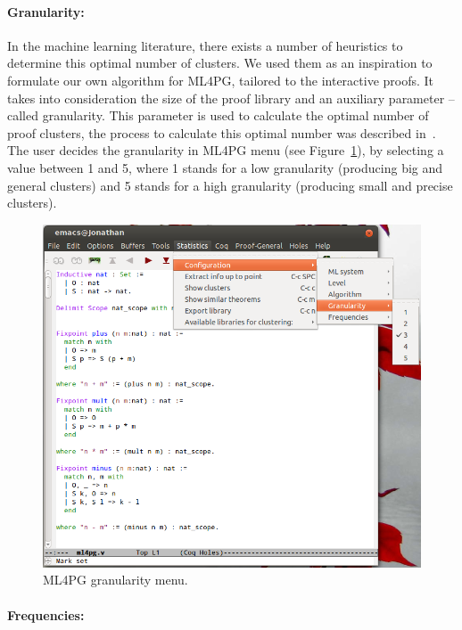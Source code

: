 \documentclass[10pt]{article}
\begin{document}
\paragraph{Granularity:}

In the machine learning literature, there exists a number of heuristics to determine this optimal number of clusters.
We used them as an inspiration to formulate our own algorithm for ML4PG, tailored
to the interactive proofs. It takes into consideration the size of the proof library and an auxiliary parameter 
 -- called granularity. This parameter is used to calculate the optimal number of
proof clusters, the process to calculate this optimal number was described in~\cite{KHG12}. The user decides the 
granularity in ML4PG menu (see Figure~\ref{granularity}), by selecting a value between 1 and 5, where 1 stands for a
low granularity (producing big and general clusters) and 5 stands for a high granularity (producing small
and precise clusters). 


\begin{figure}
 \centering
 \includegraphics[scale=0.4]{images/granularity.png}
 \caption{ML4PG granularity menu.}\label{granularity}
\end{figure}



\paragraph{Frequencies:}
\end{document}
